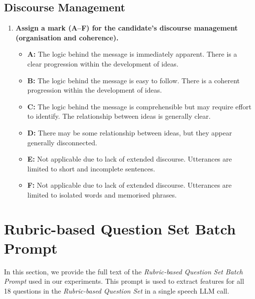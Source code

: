 \documentclass{report}
\begin{document}
\subsection*{Discourse Management}
\begin{enumerate}
  \item \textbf{Assign a mark (A--F) for the candidate's discourse management (organisation and coherence).}
  \begin{itemize}
    \item \textbf{A:} The logic behind the message is immediately apparent. There is a clear progression within the development of ideas.
    \item \textbf{B:} The logic behind the message is easy to follow. There is a coherent progression within the development of ideas.
    \item \textbf{C:} The logic behind the message is comprehensible but may require effort to identify. The relationship between ideas is generally clear.
    \item \textbf{D:} There may be some relationship between ideas, but they appear generally disconnected.
    \item \textbf{E:} Not applicable due to lack of extended discourse. Utterances are limited to short and incomplete sentences.
    \item \textbf{F:} Not applicable due to lack of extended discourse. Utterances are limited to isolated words and memorised phrases.
  \end{itemize}
\end{enumerate}

\section{Rubric-based Question Set Batch Prompt}
\label{app_sec:rubric_based_question_set_batch}
In this section, we provide the full text of the \emph{Rubric-based Question Set Batch Prompt} used in our experiments. This prompt is used to extract features for all 18 questions in the \emph{Rubric-based Question Set} in a single speech LLM call.
\end{document}
